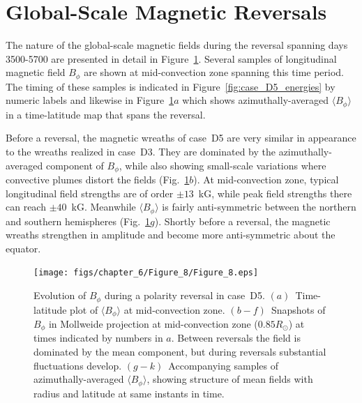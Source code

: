 \section{Global-Scale Magnetic Reversals}

The nature of the global-scale magnetic fields during the reversal
spanning days 3500-5700
are presented in detail in Figure~\ref{fig:case_D5_reversal}.  Several
samples of longitudinal magnetic field $B_\phi$ are shown at mid-convection zone spanning this
time period.  The timing of these samples is indicated in
Figure~\ref{fig:case_D5_energies} by numeric labels and likewise in
Figure~\ref{fig:case_D5_reversal}$a$ which shows azimuthally-averaged
$\langle B_\phi \rangle$ in a time-latitude map that spans the
reversal.

Before a reversal, the magnetic wreaths of case~D5 are very similar
in appearance to the wreaths realized in case~D3.  They are dominated
by the azimuthally-averaged component of 
$B_\phi$, while also showing small-scale variations where convective
plumes distort the fields (Fig.~\ref{fig:case_D5_reversal}$b$).
At mid-convection zone, typical longitudinal field strengths are of
order $\pm 13$~kG, while peak field strengths there can reach $\pm 40$~kG. 
Meanwhile $\langle B_\phi \rangle$ is fairly anti-symmetric 
between the northern and southern hemispheres
(Fig.~\ref{fig:case_D5_reversal}$g$).  Shortly before a reversal, the
magnetic wreaths strengthen in amplitude and become more
anti-symmetric about the equator. 


\begin{figure}
  \begin{center}
    \texttt{[image: figs/chapter\_6/Figure\_8/Figure\_8.eps]}
  \end{center}
  \caption[Evolution of $B_\phi$ during a polarity reversal in case~D5]
          {Evolution of $B_\phi$ during a polarity reversal in case~D5.
    $(a)$~Time-latitude plot of $\langle B_\phi \rangle$ at
    mid-convection zone.  $(b-f)$~Snapshots of $B_\phi$ in Mollweide
    projection at mid-convection zone ($0.85R_\odot$) at times
    indicated by numbers in $a$.  Between reversals the field is dominated by the
    mean component, but during reversals substantial fluctuations
    develop.  $(g-k)$~Accompanying samples of azimuthally-averaged 
    $\langle B_\phi \rangle$, showing structure of mean fields
    with radius and latitude at same instants in time.
  \label{fig:case_D5_reversal}}
\end{figure}

